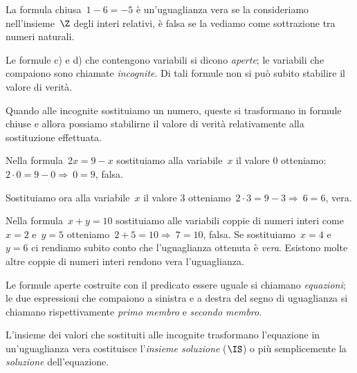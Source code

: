  \begin{esempio}{}{}
 La formula chiusa~\(1 - 6 = -5\) è un'uguaglianza
vera se la consideriamo nell'insieme~\(\Z\) degli interi
relativi, è falsa se la vediamo come sottrazione tra numeri naturali.
 \end{esempio}

Le formule c) e d) che contengono variabili si dicono \emph{aperte}; le 
variabili che compaiono sono chiamate
\emph{incognite}. Di tali formule non si può subito stabilire il valore di 
verità.

Quando alle incognite sostituiamo un numero, queste si trasformano in
formule chiuse e allora possiamo stabilirne il valore di verità
relativamente alla sostituzione effettuata.

 \begin{esempio}{}{}
 Nella formula~\(2x = 9 - x\) sostituiamo alla variabile~\(x\) il valore 
\(0\) 
otteniamo:~\(2\cdot 0=9-0 \Rightarrow~0=9\), falsa.

 Sostituiamo ora alla
variabile~\(x\) il valore \(3\) otteniamo~\(2\cdot 3=9-3 \Rightarrow~6=6\), 
vera.
 \end{esempio}

 \begin{esempio}{}{}
 Nella formula~\(x + y = 10\) sostituiamo
alle variabili coppie di numeri interi come~\(x = 2\) e~\(y = 5\) 
otteniamo~\(2+5=10\Rightarrow~7= 10\), falsa. Se
sostituiamo~\(x = 4\) e~\(y = 6\) ci rendiamo subito conto che
l'uguaglianza ottenuta è \emph{vera}. Esistono
molte altre coppie di numeri interi rendono vera
l'uguaglianza.
 \end{esempio}

\begin{definizione}{}{}
 Le formule aperte costruite con il predicato essere uguale si chiamano
\emph{equazioni}; le due espressioni che compaiono a sinistra e a
destra del segno di uguaglianza si chiamano rispettivamente
\emph{primo membro} e \emph{secondo membro}.

L'insieme dei valori che sostituiti alle incognite trasformano l'equazione in
un'uguaglianza vera costituisce
l'\emph{insieme soluzione} (\(\IS\)) o più semplicemente la \emph{soluzione} 
dell'equazione.
\end{definizione}

